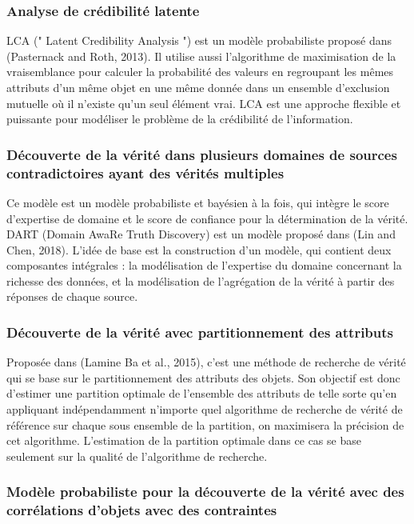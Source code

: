 \documentclass[12pt]{report}
\begin{document}
\subsubsection{Analyse de crédibilité latente}

LCA (" Latent Credibility Analysis ") est un modèle probabiliste proposé
dans (Pasternack and Roth, 2013). Il utilise aussi l’algorithme de
maximisation de la vraisemblance pour calculer la probabilité des valeurs
en regroupant les mêmes attributs d’un même objet en une même donnée
dans un ensemble d’exclusion mutuelle où il n’existe qu’un seul élément
vrai. LCA est une approche flexible et puissante pour modéliser le
problème de la crédibilité de l’information\cite{52}.
\subsubsection{Découverte de la vérité dans plusieurs domaines de sources contradictoires ayant des vérités multiples}

Ce modèle est un modèle probabiliste et bayésien à la fois, qui intègre le
score d’expertise de domaine et le score de confiance pour la
détermination de la vérité. DART (Domain AwaRe Truth Discovery) est un
modèle proposé dans (Lin and Chen, 2018). L’idée de base est la
construction d’un modèle, qui contient deux composantes intégrales : la
modélisation de l’expertise du domaine concernant la richesse des
données, et la modélisation de l’agrégation de la vérité à partir des
réponses de chaque source\cite{53}.
\subsubsection{Découverte de la vérité avec partitionnement des attributs}

Proposée dans (Lamine Ba et al., 2015), c’est une méthode de recherche de
vérité qui se base sur le partitionnement des attributs des objets. Son
objectif est donc d’estimer une partition optimale de l’ensemble des
attributs de telle sorte qu’en appliquant indépendamment n’importe quel
algorithme de recherche de vérité de référence sur chaque sous ensemble
de la partition, on maximisera la précision de cet algorithme. L’estimation
de la partition optimale dans ce cas se base seulement sur la qualité de
l’algorithme de recherche\cite{54}.


\subsubsection{Modèle probabiliste pour la découverte de la vérité avec des corrélations d’objets avec des contraintes}
\end{document}
